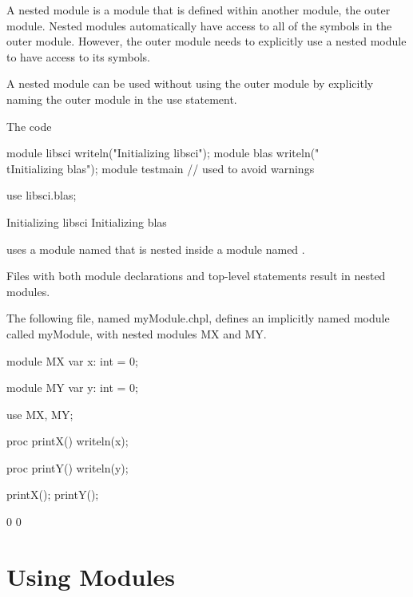 A nested module is a module that is defined within another module, the
outer module.  Nested modules automatically have access to all of the
symbols in the outer module.  However, the outer module needs to
explicitly use a nested module to have access to its symbols.

A nested module can be used without using the outer module by
explicitly naming the outer module in the use statement.
\begin{example}
The code
\begin{chapelpre}
module libsci {
  writeln("Initializing libsci");
  module blas {
    writeln("\\tInitializing blas");
  }
}
module testmain { // used to avoid warnings
}
\end{chapelpre}
\begin{chapel}
use libsci.blas;
\end{chapel}
\begin{chapeloutput}
Initializing libsci
	Initializing blas
\end{chapeloutput}
uses a module named  that is nested inside a module
named .
\end{example}

Files with both module declarations and top-level statements result in
nested modules.

\begin{example}
The following file, named myModule.chpl, defines an
implicitly named module called myModule, with nested modules
MX and MY.
\begin{chapelpre}
\end{chapelpre}
\begin{chapel}
module MX {
  var x: int = 0;
}

module MY {
  var y: int = 0;
}

use MX, MY;

proc printX() {
  writeln(x);
}

proc printY() {
  writeln(y);
}
\end{chapel}
\begin{chapelpost}
printX();
printY();
\end{chapelpost}
\begin{chapeloutput}
0
0
\end{chapeloutput}
\end{example}


\section{Using Modules}
\label{Using_Modules}

